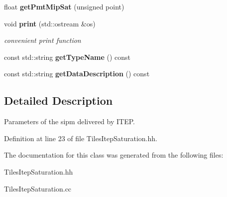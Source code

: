 \begin{DoxyCompactItemize}
\item 
float {\bfseries getPmtMipSat} (unsigned point)\label{classCALICE_1_1TilesItepSaturation_abef08955e261b0c3b419ba56ece1d5df}

\item 
void {\bf print} (std::ostream \&os)\label{classCALICE_1_1TilesItepSaturation_a4b40234c9e0d1c22c2a13fa47b4fad7d}

\begin{DoxyCompactList}\small\item\em convenient print function \item\end{DoxyCompactList}\item 
const std::string {\bfseries getTypeName} () const \label{classCALICE_1_1TilesItepSaturation_a3e451bde21fa2a6341f2a419015db1a6}

\item 
const std::string {\bfseries getDataDescription} () const \label{classCALICE_1_1TilesItepSaturation_a488b198fa1cb769b3023669cf23a1200}

\end{DoxyCompactItemize}


\subsection{Detailed Description}
Parameters of the sipm delivered by ITEP. 

Definition at line 23 of file TilesItepSaturation.hh.

The documentation for this class was generated from the following files:\begin{DoxyCompactItemize}
\item 
TilesItepSaturation.hh\item 
TilesItepSaturation.cc\end{DoxyCompactItemize}

